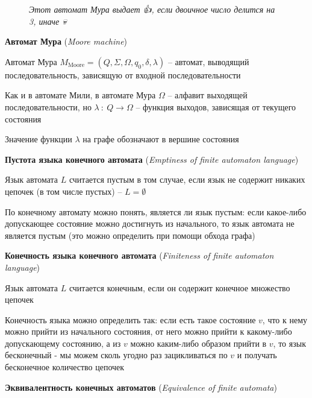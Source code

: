 \documentclass[12pt]{article}
\begin{document}
\begin{enumerate}
\begin{minipage}{\linewidth}
\begin{figure}
                \footnotesize
                \textit{Этот автомат Мура выдает {\Large 👍}, если двоичное число делится на 3, иначе {\Large 💀}}


            \end{figure}

            \item \textbf{Автомат Мура} (\textit{Moore machine})

            Автомат Мура $M_{\text{Moore}} = (Q, \Sigma, \Omega, q_0, \delta, \lambda)$ -- автомат, выводящий последовательность, зависящую от входной последовательности

            Как и в автомате Мили, в автомате Мура $\Omega$ -- алфавит выходящей последовательности, но
            $\lambda \ : \ Q \to \Omega$ -- функция выходов, зависящая от текущего состояния

            Значение функции $\lambda$ на графе обозначают в вершине состояния

        \end{minipage}

        \smallvspace


        \item \textbf{Пустота языка конечного автомата} (\textit{Emptiness of finite automaton language})

        Язык автомата $L$ считается пустым в том случае, если язык не содержит никаких цепочек (в том числе пустых) -- $L = \emptyset$

        По конечному автомату можно понять, является ли язык пустым: если какое-либо допускающее состояние можно достигнуть из начального,
        то язык автомата не является пустым (это можно определить при помощи обхода графа)

        \item \textbf{Конечность языка конечного автомата} (\textit{Finiteness of finite automaton language})

        Язык автомата $L$ считается конечным, если он содержит конечное множество цепочек

        Конечность языка можно определить так: если есть такое состояние $v$, что к нему можно прийти из начального состояния,
        от него можно прийти к какому-либо допускающему состоянию, а из $v$ можно каким-либо образом прийти в $v$, то язык бесконечный -
        мы можем сколь угодно раз зацикливаться по $v$ и получать бесконечное количество цепочек

        \item \textbf{Эквивалентность конечных автоматов} (\textit{Equivalence of finite automata})


\end{enumerate}
\end{document}
